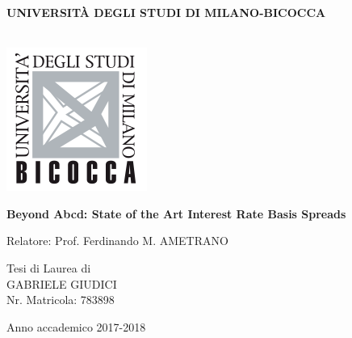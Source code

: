 \begin{titlepage}
	
\large{\textbf {UNIVERSIT\`A DEGLI STUDI DI MILANO-BICOCCA}}\\
\\
[1cm]
\begin{center}
	
	\includegraphics[scale=0.8]{images/logo1}
	
		\Large{\bfseries Beyond Abcd: State of the Art Interest Rate Basis Spreads}\\
		
		\begin{flushleft}
		{\large Relatore: Prof. Ferdinando M. AMETRANO\\}
		\end{flushleft}
		
	
		\begin{flushright}
		{\large Tesi di Laurea di\\
		GABRIELE GIUDICI\\
		Nr. Matricola: 783898\\}
		\end{flushright}
		
\normalsize{Anno accademico 2017-2018}
\end{center}

\end{titlepage}
